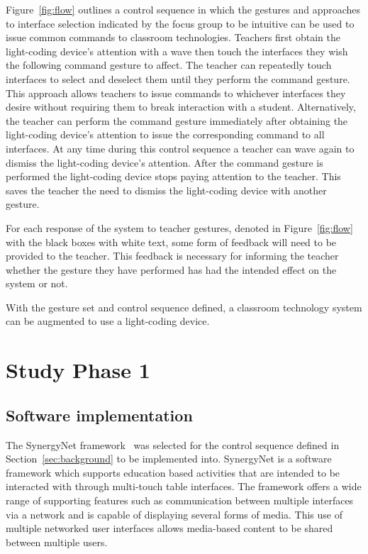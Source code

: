 \documentclass[link]{IWCOMP}
\begin{document}
Figure~\ref{fig:flow} outlines a control sequence in which the gestures and approaches to interface selection indicated by the focus group to be intuitive can be used to issue common commands to classroom technologies.
Teachers first obtain the light-coding device's attention with a wave then touch the interfaces they wish the following command gesture to affect.
The teacher can repeatedly touch interfaces to select and deselect them until they perform the command gesture.
This approach allows teachers to issue commands to whichever interfaces they desire without requiring them to break interaction with a student.
Alternatively, the teacher can perform the command gesture immediately after obtaining the light-coding device's attention to issue the corresponding command to all interfaces.
At any time during this control sequence a teacher can wave again to dismiss the light-coding device's attention.
After the command gesture is performed the light-coding device stops paying attention to the teacher.
This saves the teacher the need to dismiss the light-coding device with another gesture.

For each response of the system to teacher gestures, denoted in Figure~\ref{fig:flow} with the black boxes with white text, some form of feedback will need to be provided to the teacher.
This feedback is necessary for informing the teacher whether the gesture they have performed has had the intended effect on the system or not.

With the gesture set and control sequence defined, a classroom technology system can be augmented to use a light-coding device.

\section{Study Phase 1} 
\label{sec:studyPhase1}


\subsection{Software implementation}
\label{subsec:studyPhase1Implementation}


The SynergyNet framework~\cite{Higgins2011} was selected for the control sequence defined in Section~\ref{sec:background} to be implemented into.
SynergyNet is a software framework which supports education based activities that are intended to be interacted with through multi-touch table interfaces.
The framework offers a wide range of supporting features such as communication between multiple interfaces via a network and is capable of displaying several forms of media.
This use of multiple networked user interfaces allows media-based content to be shared between multiple users.
\end{document}
